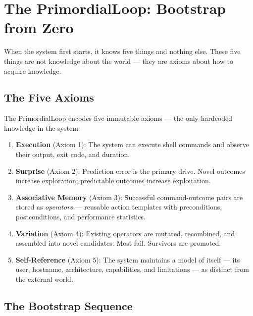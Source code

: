 \documentclass[12pt,a4paper]{report}
\begin{document}
\chapter{The PrimordialLoop: Bootstrap from Zero}

When the system first starts, it knows five things and nothing else. These five things are not knowledge about the world --- they are axioms about how to acquire knowledge.

\section{The Five Axioms}
The PrimordialLoop encodes five immutable axioms --- the only hardcoded knowledge in the system:

\begin{enumerate}
    \item \textbf{Execution} (Axiom 1): The system can execute shell commands and observe their output, exit code, and duration.
    \item \textbf{Surprise} (Axiom 2): Prediction error is the primary drive. Novel outcomes increase exploration; predictable outcomes increase exploitation.
    \item \textbf{Associative Memory} (Axiom 3): Successful command-outcome pairs are stored as \emph{operators} --- reusable action templates with preconditions, postconditions, and performance statistics.
    \item \textbf{Variation} (Axiom 4): Existing operators are mutated, recombined, and assembled into novel candidates. Most fail. Survivors are promoted.
    \item \textbf{Self-Reference} (Axiom 5): The system maintains a model of itself --- its user, hostname, architecture, capabilities, and limitations --- as distinct from the external world.
\end{enumerate}

\section{The Bootstrap Sequence}
\end{document}
